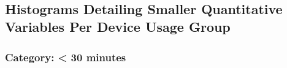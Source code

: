 \documentclass[11pt]{article}
\begin{document}
    \begin{center}
    \end{center}
    { \hspace*{\fill} \\}
    
    \hypertarget{histograms-detailing-smaller-quantitative-variables-per-device-usage-group}{%
    \newpage
    \subsection{Histograms Detailing Smaller Quantitative Variables Per
Device Usage
Group}\label{histograms-detailing-smaller-quantitative-variables-per-device-usage-group}}

    \hypertarget{category-30-minutes}{%
\subsubsection{Category: \textless{} 30
minutes}\label{category-30-minutes}}
\end{document}
